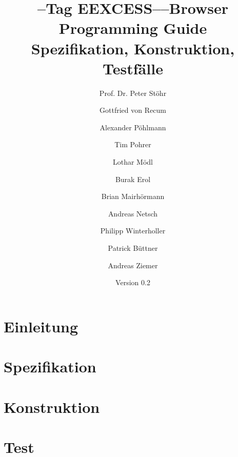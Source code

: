 \documentclass[
    DIV12,
    cleardouble=plain,
    headings=normal,
    pdftex,
    headexclude,footexclude,
    final
]{scrreprt}
\title{
  \SEARCH--Tag
  EEXCESS--\SECH--Browser \\[1em]
  Programming Guide\\
Spezifikation, Konstruktion, Testfälle
}
\author{Prof. Dr. Peter Stöhr \and Gottfried von Recum \and Alexander Pöhlmann \and Tim Pohrer \and Lothar Mödl \and Burak Erol \and Brian Mairhörmann \and Andreas Netsch \and Philipp Winterholler \and Patrick Büttner \and Andreas Ziemer}
\date{Version 0.2}
\begin{document}
\maketitle
{}
\tableofcontents

\newpage
{}

\part{Einleitung}





\part{Spezifikation}





\part{Konstruktion}
















\part{Test}


\newpage
\listoffigures
\listoftables
\end{document}
